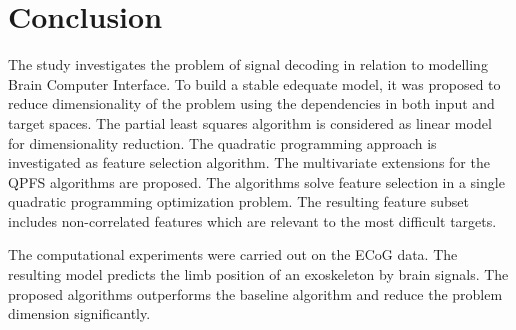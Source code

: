 \documentclass[12pt,oneside]{article}
\theoremstyle{definition}
\begin{document}
\newpage
\section{Conclusion}
The study investigates the problem of signal decoding in relation to modelling Brain Computer Interface. 
To build a stable edequate model, it was proposed to reduce dimensionality of the problem using the dependencies in both input and target spaces.
The partial least squares algorithm is considered as linear model for dimensionality reduction.
The quadratic programming approach is investigated as feature selection algorithm.
The multivariate extensions for the QPFS algorithms are proposed.
The algorithms solve feature selection in a single quadratic programming optimization problem.
The resulting feature subset includes non-correlated features which are relevant to the most difficult targets.

The computational experiments were carried out on the ECoG data. 
The resulting model predicts the limb position of an exoskeleton by brain signals.
The proposed algorithms outperforms the baseline algorithm and reduce the problem dimension significantly.


\newpage

\end{document}

